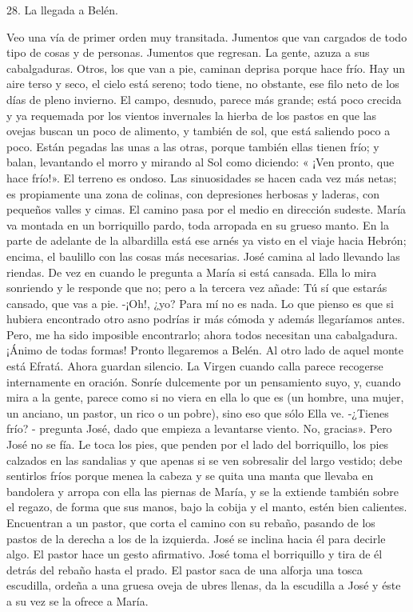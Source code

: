 \documentclass[12pt]{book} %
\begin{document}
 
28. 
La llegada a Belén. 
 
Veo una vía de primer orden muy transitada. Jumentos que van cargados de todo tipo de cosas y de personas. Jumentos que regresan. La gente, azuza a sus cabalgaduras. Otros, los que van a pie, caminan deprisa porque hace frío. 
Hay un aire terso y seco, el cielo está sereno; todo tiene, no obstante, ese filo neto de los días de pleno invierno. El 
campo, desnudo, parece más grande; está poco crecida y ya requemada por los vientos invernales la hierba de los pastos en que las ovejas buscan un poco de alimento, y también de sol, que está saliendo poco a poco. Están pegadas las unas a las otras, porque también ellas tienen frío; y balan, levantando el morro y mirando al Sol como diciendo: « ¡Ven pronto, que hace frío!». El terreno es ondoso. Las sinuosidades se hacen cada vez más netas; es propiamente una zona de colinas, con depresiones herbosas y laderas, con pequeños valles y cimas. El camino pasa por el medio en dirección sudeste. 
María va montada en un borriquillo pardo, toda arropada en su grueso manto. En la parte de adelante de la albardilla 
está ese arnés ya visto en el viaje hacia Hebrón; encima, el baulillo con las cosas más necesarias. 
José camina al lado llevando las riendas. De vez en cuando le pregunta a María si está cansada. Ella lo mira sonriendo y le responde que no; pero a la tercera vez añade: 
Tú sí que estarás cansado, que vas a pie. 
-¡Oh!, ¿yo? Para mí no es nada. Lo que pienso es que si hubiera encontrado otro asno podrías ir más cómoda y además llegaríamos antes. Pero, me ha sido imposible encontrarlo; ahora todos necesitan una cabalgadura. ¡Ánimo de todas formas! Pronto llegaremos a Belén. Al otro lado de aquel monte está Efratá. 
Ahora guardan silencio. La Virgen cuando calla parece recogerse internamente en oración. Sonríe dulcemente por un pensamiento suyo, y, cuando mira a la gente, parece como si no viera en ella lo que es (un hombre, una mujer, un anciano, un pastor, un rico o un pobre), sino eso que sólo Ella ve. 
-¿Tienes frío? - pregunta José, dado que empieza a levantarse viento. 
No, gracias». 
Pero José no se fía. Le toca los pies, que penden por el lado del borriquillo, los pies calzados en las sandalias y que 
apenas si se ven sobresalir del largo vestido; debe sentirlos fríos porque menea la cabeza y se quita una manta que llevaba en bandolera y arropa con ella las piernas de María, y se la extiende también sobre el regazo, de forma que sus manos, bajo la cobija y el manto, estén bien calientes. 
Encuentran a un pastor, que corta el camino con su rebaño, pasando de los pastos de la derecha a los de la izquierda. José se inclina hacia él para decirle algo. El pastor hace un gesto afirmativo. José toma el borriquillo y tira de él detrás del rebaño hasta el prado. El pastor saca de una alforja una tosca escudilla, ordeña a una gruesa oveja de ubres llenas, da la escudilla a José y éste a su vez se la ofrece a María. 
\end{document}
